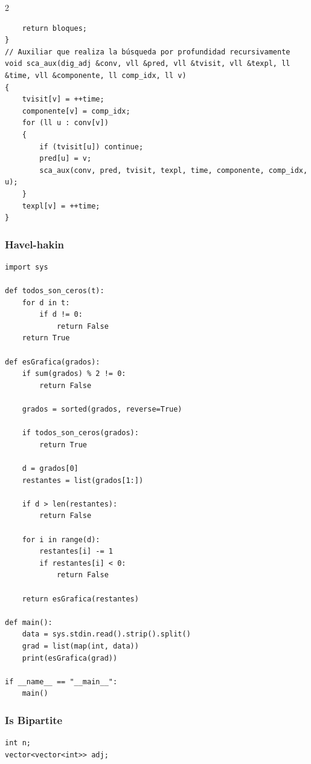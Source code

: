 \documentclass[twoside]{article}
\begin{document}
\begin{multicols*}{2}
\begin{verbatim}
    return bloques;
}
// Auxiliar que realiza la búsqueda por profundidad recursivamente
void sca_aux(dig_adj &conv, vll &pred, vll &tvisit, vll &texpl, ll &time, vll &componente, ll comp_idx, ll v)
{
    tvisit[v] = ++time;
    componente[v] = comp_idx;
    for (ll u : conv[v])
    {
        if (tvisit[u]) continue;
        pred[u] = v;
        sca_aux(conv, pred, tvisit, texpl, time, componente, comp_idx, u);
    }
    texpl[v] = ++time;
}

\end{verbatim}

	{
		\subsubsection*{Havel-hakin}
	}
	\begin{verbatim}
import sys

def todos_son_ceros(t):
    for d in t:
        if d != 0:
            return False
    return True

def esGrafica(grados):
    if sum(grados) % 2 != 0:
        return False
    
    grados = sorted(grados, reverse=True)    
    
    if todos_son_ceros(grados):
        return True

    d = grados[0]
    restantes = list(grados[1:])

    if d > len(restantes):
        return False
    
    for i in range(d):
        restantes[i] -= 1
        if restantes[i] < 0:
            return False
        
    return esGrafica(restantes)

def main():
    data = sys.stdin.read().strip().split()
    grad = list(map(int, data))
    print(esGrafica(grad))

if __name__ == "__main__":
    main()

\end{verbatim}

	{
		\subsubsection*{Is Bipartite}
	}
	\begin{verbatim}
int n; 
vector<vector<int>> adj; 


\end{verbatim}
\end{multicols*}
\end{document}
